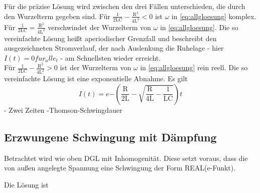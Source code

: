 Für die präzise Lösung wird zwischen den drei Fällen unterschieden, die durch den Wurzelterm gegeben sind.
Für $\frac{1}{2\mathup{LC}}-\frac{\mathup{R^2}}{4\mathup{L^2}}<0$ ist $\omega$ in \eqref{eq:allgloesung} komplex.\\
Für $\frac{1}{2\mathup{LC}}=\frac{\mathup{R^2}}{4\mathup{L^2}}$ verschwindet der Wurzelterm von $\omega$ in \eqref{eq:allgloesung}.
Die so vereinfachte Lösung heißt aperiodischer Grenzfall und beschreibt den ausgezeichneten Stromverlauf, der nach Auslenkung die Ruhelage - hier $I(t)=0 fur_alle_t$ - am Schnellsten wieder erreicht.\\
Für $\frac{1}{2\mathup{LC}}-\frac{\mathup{R^2}}{4\mathup{L^2}}>0$ ist der Wurzelterm von $\omega$ in \eqref{eq:allgloesung} rein reell.
Die so vereinfachte Lösung ist eine exponentielle Abnahme.
Es gilt
\begin{equation}
	I(t)=e{−(\frac{\mathup{R}}{\mathup{2L}} − \sqrt{\frac{\mathup{R}}{\mathup{4L}} −\frac{1}{\mathup{LC}}})t}
\end{equation}
- Zwei Zeiten
-Thomson-Schwingdauer
\subsection{Erzwungene Schwingung mit Dämpfung}
Betrachtet wird wie oben DGL mit Inhomogenität. 
Diese setzt voraus, dass die von außen angelegte Spannung eine Schwingung der Form REAL(e-Funkt).

Die Lösung ist


